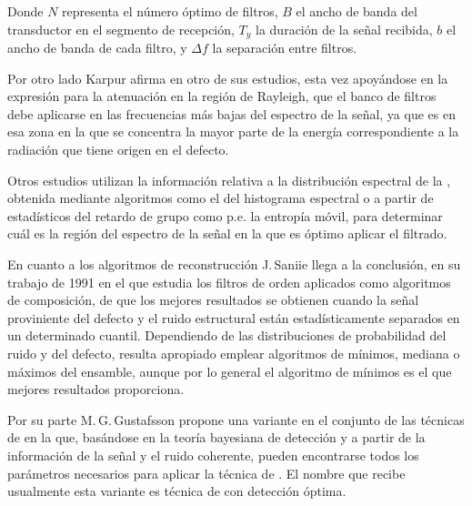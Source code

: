 Donde $N$ representa el número óptimo de filtros, $B$ el ancho de banda del transductor en el segmento de recepción, $T_y$ la duración de la señal recibida, $b$ el ancho de banda de cada filtro, y $\Delta f$ la separación entre filtros.\par
Por otro lado Karpur afirma en otro de sus estudios, esta vez apoyándose en la expresión para la atenuación en la región de Rayleigh, que el banco de filtros debe aplicarse en las frecuencias más bajas del espectro de la señal, ya que es en esa zona en la que se concentra la mayor parte de la energía correspondiente a la radiación que tiene origen en el defecto.\par
Otros estudios utilizan la información relativa a la distribución espectral de la , obtenida mediante algoritmos como el del histograma espectral o a partir de estadísticos del retardo de grupo como p.e. la entropía móvil, para determinar cuál es la región del espectro de la señal en la que es óptimo aplicar el filtrado.\par
En cuanto a los algoritmos de reconstrucción J.\,Saniie llega a la conclusión, en su trabajo de 1991 en el que estudia los filtros de orden aplicados como algoritmos de composición, de que los mejores resultados se obtienen cuando la señal proviniente del defecto y el ruido estructural están estadísticamente separados en un determinado cuantil. Dependiendo de las distribuciones de probabilidad del ruido y del defecto, resulta apropiado emplear algoritmos de mínimos, mediana o máximos del ensamble, aunque por lo general el algoritmo de mínimos es el que mejores resultados proporciona.\par
Por su parte M.\,G.\,Gustafsson propone una variante en el conjunto de las técnicas de  en la que, basándose en la teoría bayesiana de detección y a partir de la información de la señal y el ruido coherente, pueden encontrarse todos los parámetros necesarios para aplicar la técnica de . El nombre que recibe usualmente esta variante es técnica de  con detección óptima.
